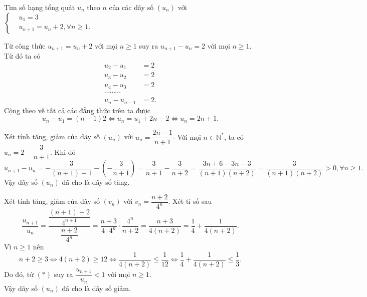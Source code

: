 \begin{bt}%
	Tìm số hạng tổng quát $u_n$ theo $n$ của các dãy số $(u_n)$ với $\left\{\begin{aligned}&u_1=3 \\&u_{n+1}=u_n+2, \forall n\geq 1.\end{aligned}\right.$
	
	\loigiai
	{Từ công thức $u_{n+1}=u_n+2$ với mọi $n\geq 1$ suy ra $u_{n+1}-u_n=2$ với mọi $n\geq 1$. Từ đó ta có
		\allowdisplaybreaks
		\begin{align*}
			u_2-u_1 &= 2\\
			u_3-u_2 &= 2\\
			u_4-u_3 &= 2\\
			\cdots\cdots\cdots\\
			u_{n}-u_{n-1} & =2.
		\end{align*}
		Cộng theo vế tất cả các đẳng thức trên ta được
		\[u_n-u_1 = (n-1)2 \Leftrightarrow u_n = u_1+2n-2 \Leftrightarrow u_n=2n+1.\]
		
	}
\end{bt}

\begin{bt}%
	Xét tính tăng, giảm của dãy số $(u_n)$ với $u_n=\dfrac{2n-1}{n+1}$.
	\loigiai
	{Với mọi $n\in \mathbb{N}^*$, ta có $u_n=2-\dfrac{3}{n+1}$. Khi đó
		\[u_{n+1}-u_n= -\dfrac{3}{(n+1)+1}-\left(-\dfrac{3}{n+1}\right) = \dfrac{3}{n+1}-\dfrac{3}{n+2} = \dfrac{3n+6-3n-3}{(n+1)(n+2)} = \dfrac{3}{(n+1)(n+2)}>0, \forall n\geq 1.\]
		Vậy dãy số $(u_n)$ đã cho là dãy số tăng.
	}
\end{bt}

\begin{bt}%
	Xét tính tăng, giảm của dãy số $(v_n)$ với $v_n=\dfrac{n+2}{4^n}$.
\loigiai
{
	Xét tỉ số sau
	\[\dfrac{u_{n+1}}{u_n} = \dfrac{\dfrac{(n+1)+2}{4^{n+1}}}{\dfrac{n+2}{4^n}} = \dfrac{n+3}{4\cdot 4^n}\cdot \dfrac{4^n}{n+2} = \dfrac{n+3}{4(n+2)} = \dfrac{1}{4}+\dfrac{1}{4(n+2)}.\tag{$*$}\]
	Vì $n \geq 1$ nên
	\[n+2 \geq 3 \Leftrightarrow 4(n+2)\geq 12 \Leftrightarrow \dfrac{1}{4(n+2)} \leq \dfrac{1}{12} \Leftrightarrow \dfrac{1}{4}+\dfrac{1}{4(n+2)}\leq \dfrac{1}{3}.\]
	Do đó, từ $(*)$ suy ra $\dfrac{u_{n+1}}{u_n}<1$ với mọi $n\geq 1$.\\
	Vậy dãy số $(u_n)$ đã cho là dãy số giảm.
}
\end{bt}

